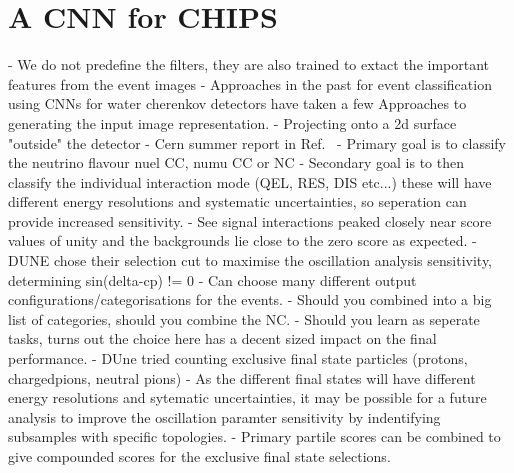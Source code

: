 \section{A CNN for CHIPS}
\label{sec:cvn_cnn_for_chips}
- We do not predefine the filters, they are also trained to extact the important features from the event images
- Approaches in the past for event classification using CNNs for water cherenkov detectors have taken a few Approaches to generating the input image representation.
- Projecting onto a 2d surface "outside" the detector
- Cern summer report in Ref.~\cite{theodore2016}
- Primary goal is to classify the neutrino flavour nuel CC, numu CC or NC
- Secondary goal is to then classify the individual interaction mode (QEL, RES, DIS etc...) these will have different energy resolutions and systematic uncertainties, so seperation can provide increased sensitivity.
- See signal interactions peaked closely near score values of unity and the backgrounds lie close to the zero score as expected.
- DUNE chose their selection cut to maximise the oscillation analysis sensitivity, determining sin(delta-cp) != 0
- Can choose many different output configurations/categorisations for the events.
- Should you combined into a big list of categories, should you combine the NC.
- Should you learn as seperate tasks, turns out the choice here has a decent sized impact on the final performance.
- DUne tried counting exclusive final state particles (protons, chargedpions, neutral pions)
- As the different final states will have different energy resolutions and sytematic uncertainties, it may be possible for a future analysis to improve the oscillation paramter sensitivity by indentifying subsamples with specific topologies.
- Primary partile scores can be combined to give compounded scores for the exclusive final state selections.

